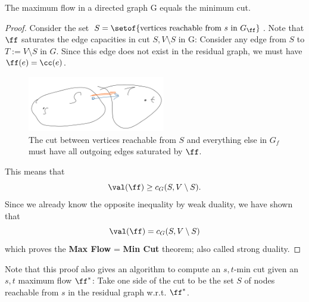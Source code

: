 \begin{theorem}[Max Flow $=$ Min Cut theorem] \label{thm:maxFlowEqualsMinCut} The maximum flow in a directed graph G equals the minimum cut.
\end{theorem}
\begin{proof}
Consider the set $S = \setof{ \text{vertices reachable from } s \text{ in
  } G_{\ff}}$.
Note that \(\ff\) saturates the
edge capacities in cut \(S,V\setminus S\) in G:
Consider any edge from $S$ to $T:=V \setminus S$ in $G$. Since this edge does not
exist in the residual graph, we must have $\ff(e) = \cc(e)$.
\begin{figure}[H]
 \centering
 \includegraphics[width=60mm,scale=0.5]{fig/fig14_lec10.PNG}
 \caption{The cut between vertices reachable from $S$ and everything
   else in $G_f$ must have all outgoing edges saturated by $\ff$.}
  \label{fig:ex14}
\end{figure}
%
This means that
\begin{equation} \nonumber
   \val(\ff) \geq c_G(S, V \setminus S).
\end{equation}
Since we already know the opposite inequality by weak duality, we have
shown that
\begin{equation} \nonumber
   \val(\ff) = c_G(S, V \setminus S)
\end{equation}
which proves the \textbf{Max Flow} = \textbf{Min Cut} theorem; also called strong duality.
\end{proof}

\begin{remark}
  Note that this proof also gives an algorithm to compute an $s,t$-min
  cut given an $s,t$ maximum flow $\ff^*$: Take one side of the cut to be the
  set $S$ of nodes reachable from $s$ in the residual graph w.r.t. $\ff^*$.
\end{remark}

